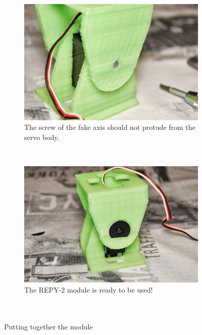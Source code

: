 \begin{figure}[H]
\begin{subfigure}[b]{0.46\textwidth}
                \label{fig:hardware_assembly_15}
        \end{subfigure}
        ~
        \begin{subfigure}[b]{0.46\textwidth}
                \centering
                \includegraphics[width=\textwidth]{images/REPY2_assembly_16.jpg}
                \caption{The screw of the fake axis should not protude from the servo body.\\}
                \label{fig:hardware_assembly_16}
        \end{subfigure}
        ~
        \begin{subfigure}[b]{0.46\textwidth}
                \centering
                \includegraphics[width=\textwidth]{images/REPY2_assembly_17.jpg}
                \caption{The REPY-2 module is ready to be used!\\~\\~}
                \label{fig:hardware_assembly_17}
        \end{subfigure}
        \caption{Putting together the module} 
        \label{fig:hardware_assembly_module}
\end{figure}

